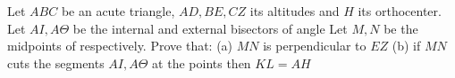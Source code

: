 Let $ ABC$ be an acute triangle, $ AD,BE,CZ$ its altitudes and $ H$ its orthocenter. Let $ AI,A \Theta$ be the internal and external bisectors of angle  Let $ M,N$ be the midpoints of  respectively. Prove that:
(a) $MN$ is perpendicular to $EZ$
(b) if $ MN$ cuts the segments $ AI,A \Theta$ at the points  then $ KL=AH$